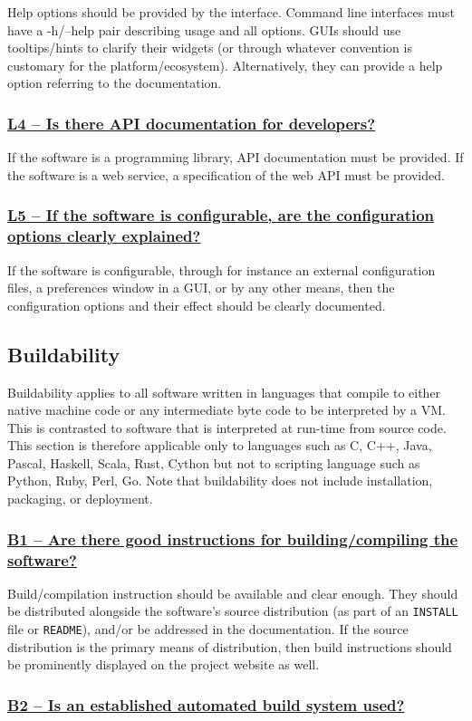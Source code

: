 \documentclass[a4paper,11pt]{article}
\newcommand{\indicator}[1]{\subsubsection*{\underline{#1}}}
\begin{document}
Help options should be provided by the interface. Command line interfaces must
have a -h/--help pair describing usage and all options. GUIs should use tooltips/hints to clarify
their widgets (or through whatever convention is customary for the
platform/ecosystem). Alternatively, they can provide a help option referring to
the documentation.

\indicator{L4 -- Is there API documentation for developers?}

If the software is a programming library, API documentation must be provided.
If the software is a web service, a specification of the web API must be provided.

\indicator{L5 -- If the software is configurable, are the configuration
options clearly explained?}

%
%

If the software is configurable, through for instance an external configuration
files, a preferences window in a GUI, or by any other means, then the
configuration options and their effect should be clearly documented. 

\subsection{Buildability}

Buildability applies to all software written in languages that compile to
either native machine code or any intermediate byte code to be interpreted by a VM.
This is contrasted to software that is interpreted at run-time from source
code. This section is therefore applicable only to languages such as C, C++,
Java, Pascal, Haskell, Scala, Rust, Cython but not to scripting language such
as Python, Ruby, Perl, Go.  Note that buildability does not include
installation, packaging, or deployment.

\indicator{B1 -- Are there good instructions for building/compiling the software?}

Build/compilation instruction should be available and clear enough. They should
be distributed alongside the software's source distribution (as part of an
\texttt{INSTALL} file or \texttt{README}), and/or be addressed in the documentation. If the
source distribution is the primary means of distribution, then build
instructions should be prominently displayed on the project website as well.

\indicator{B2 -- Is an established automated build system used?}
\end{document}
